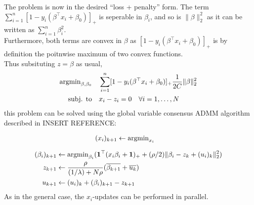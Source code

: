 \documentclass[11pt]{article}
\begin{document}
The problem is now in the desired ``loss + penalty'' form. The term $\sum_{i=1}^n [1 - y_i (\beta^\top x_i + \beta_0)]_+$  is seperable in $\beta_i$, and so is $\| \beta \|_2^2$ as it can be written as
$\sum_{i=1}^n \beta_i^2$. \\
Furthermore, both terms are convex in $\beta$ as $[1 - y_i (\beta^\top x_i + \beta_0)]_+$ is by definition the poitnwise maximum of two convex functions. \\

Thus subsituting $z = \beta$ as usual, 
\begin{equation} 
\begin{aligned}
\operatorname{argmin}_{\beta, \beta_0} \quad 
&  \sum_{i=1}^n [1 - y_i (\beta^\top x_i + \beta_0)]_+ \frac{1}{2C} \|\beta\|_2^2 \\
\textrm{subj. to} \quad & x_i - z_i = 0 \quad \forall i = 1, \ldots, N
\end{aligned}
\end{equation}
this problem can be solved using the  global
variable consensus ADMM algorithm described in INSERT REFERENCE:

\begin{equation*}
\begin{aligned}
    (x_i)_{k+1} & \leftarrow \operatorname{argmin}_{x_i}
\end{aligned}
\end{equation*}

\begin{equation*}
\begin{aligned}
    (\beta_i)_{k+1} 
    & \leftarrow \operatorname{argmin}_{\beta_i} (\mathbf{1}^\top(x_i\beta_i + \mathbf{1})_+ + (\rho/2) \|\beta_i - z_k + (u_i)_k \|_2^2) \\
    z_{k+1} 
    & \leftarrow \frac{\rho}{(1/\lambda) + N\rho} (\overline{\beta_{k+1}} + \overline{u_k}) \\
    u_{k+1} 
     & \leftarrow (u_i)_k + (\beta_i)_{k+1} - z_{k+1}
\end{aligned}
\end{equation*}
As in the general case, the $x_i$-updates can be performed in parallel.



\end{document}
